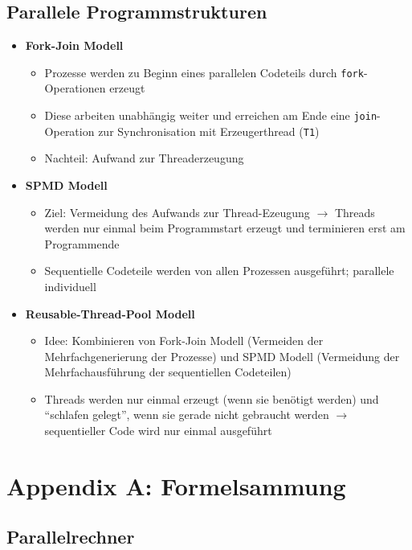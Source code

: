 \subsection{Parallele Programmstrukturen}
\begin{itemize}
	\item \textbf{Fork-Join Modell}
	\begin{itemize}
		\item Prozesse werden zu Beginn eines parallelen Codeteils durch \texttt{fork}-Operationen erzeugt
		\item Diese arbeiten unabhängig weiter und erreichen am Ende eine \texttt{join}-Operation zur Synchronisation mit Erzeugerthread (\texttt{T1})
		\item Nachteil: Aufwand zur Threaderzeugung
	\end{itemize}
	\item \textbf{SPMD Modell}
	\begin{itemize}
		\item Ziel: Vermeidung des Aufwands zur Thread-Ezeugung \(\rightarrow\) Threads werden nur einmal beim Programmstart erzeugt und terminieren erst am Programmende
		\item Sequentielle Codeteile werden von allen Prozessen ausgeführt; parallele individuell
	\end{itemize}
	\item \textbf{Reusable-Thread-Pool Modell}
	\begin{itemize}
		\item Idee: Kombinieren von Fork-Join Modell (Vermeiden der Mehrfachgenerierung der Prozesse) und SPMD Modell (Vermeidung der Mehrfachausführung der sequentiellen Codeteilen)
		\item Threads werden nur einmal erzeugt (wenn sie benötigt werden) und "`schlafen gelegt"', wenn sie gerade nicht gebraucht werden \(\rightarrow\) sequentieller Code wird nur einmal ausgeführt
	\end{itemize}
\end{itemize}



\newpage
\section{Appendix A: Formelsammung}

\subsection{Parallelrechner}

